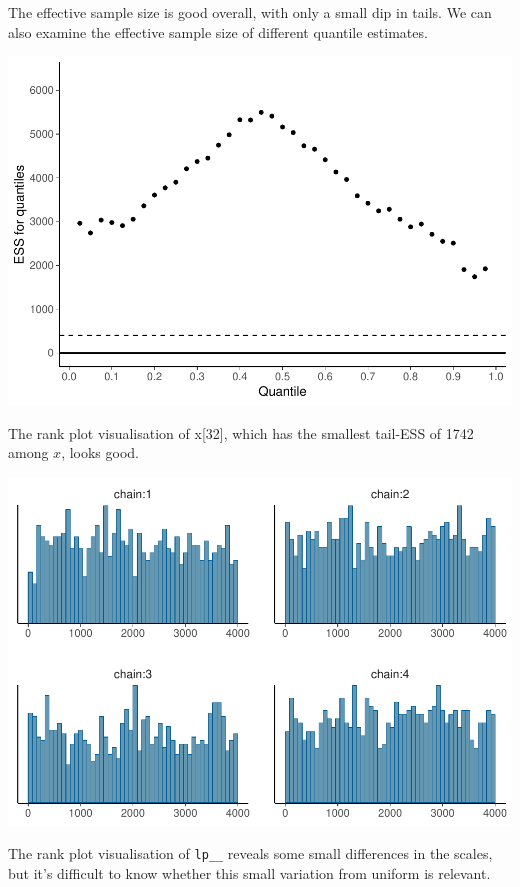 \documentclass[american,]{article}
\begin{document}
The effective sample size is good overall, with only a small dip in
tails. We can also examine the effective sample size of different
quantile estimates.

\includegraphics{graphics/quantile-ess-fit-half-nom-1.pdf}

The rank plot visualisation of x{[}32{]}, which has the smallest
tail-ESS of 1742 among \(x\), looks good.

\includegraphics{graphics/hist-fit-half-nom-1.pdf}

The rank plot visualisation of \texttt{lp\_\_} reveals some small
differences in the scales, but it's difficult to know whether this small
variation from uniform is relevant.
\end{document}
